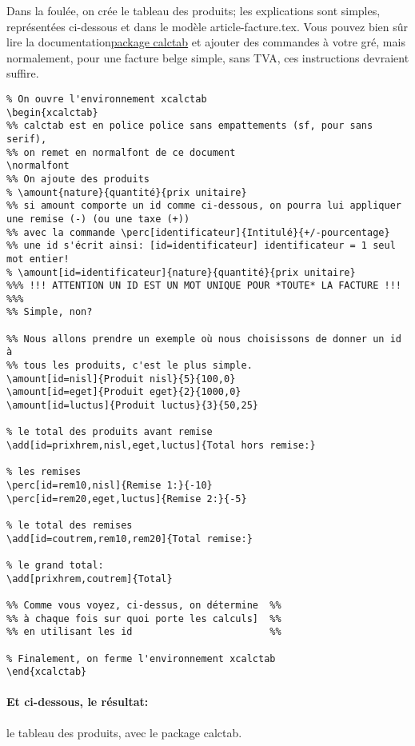 \documentclass[a4paper,10pt]{article}
\begin{document}
Dans la foulée, on crée le tableau des produits; les explications sont simples, représentées ci-dessous et dans le modèle article-facture.tex. Vous pouvez bien sûr lire la documentation\href{https://ctan.org/pkg/calctab}{package calctab} et ajouter des commandes à votre gré, mais normalement, pour une facture belge simple, sans TVA, ces instructions devraient suffire.


\begin{lstlisting}
% On ouvre l'environnement xcalctab
\begin{xcalctab}
%% calctab est en police police sans empattements (sf, pour sans serif), 
%% on remet en normalfont de ce document
\normalfont
%% On ajoute des produits 
% \amount{nature}{quantité}{prix unitaire}
%% si amount comporte un id comme ci-dessous, on pourra lui appliquer une remise (-) (ou une taxe (+))
%% avec la commande \perc[identificateur]{Intitulé}{+/-pourcentage}
%% une id s'écrit ainsi: [id=identificateur] identificateur = 1 seul mot entier!
% \amount[id=identificateur]{nature}{quantité}{prix unitaire}
%%% !!! ATTENTION UN ID EST UN MOT UNIQUE POUR *TOUTE* LA FACTURE !!! %%%
%% Simple, non?

%% Nous allons prendre un exemple où nous choisissons de donner un id à 
%% tous les produits, c'est le plus simple.
\amount[id=nisl]{Produit nisl}{5}{100,0}
\amount[id=eget]{Produit eget}{2}{1000,0}
\amount[id=luctus]{Produit luctus}{3}{50,25}

% le total des produits avant remise
\add[id=prixhrem,nisl,eget,luctus]{Total hors remise:}

% les remises
\perc[id=rem10,nisl]{Remise 1:}{-10}
\perc[id=rem20,eget,luctus]{Remise 2:}{-5}

% le total des remises
\add[id=coutrem,rem10,rem20]{Total remise:}

% le grand total:
\add[prixhrem,coutrem]{Total}

%% Comme vous voyez, ci-dessus, on détermine  %%
%% à chaque fois sur quoi porte les calculs]  %%
%% en utilisant les id                        %%

% Finalement, on ferme l'environnement xcalctab
\end{xcalctab}
\end{lstlisting}

\paragraph{Et ci-dessous, le résultat:} le tableau des produits, avec le package calctab.
\end{document}
